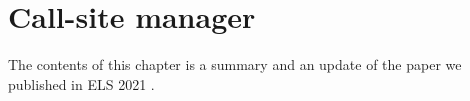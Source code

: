 \chapter{Call-site manager}
\label{chap-call-site-manager}

The contents of this chapter is a summary and an update of the paper
we published in ELS 2021 \cite{DBLP:conf/els/Strandh21}.
